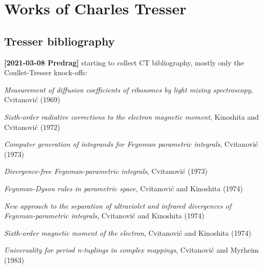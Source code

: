 
\chapter{Works of Charles Tresser}
\label{c-Tresser}

\section{Tresser bibliography}
\label{sect:Tresser}

{\bf [2021-03-08 Predrag]}
starting to collect CT bibliography, mostly only the Coullet-Tresser knock-offs:
\bigskip

{\em Measurement of diffusion coefficients of ribosomes by light mixing
spectroscopy},
{Cvitanovi{\'c}}
{(1969)}

{\em Sixth-order radiative corrections to the electron magnetic moment},
{Kinoshita and Cvitanovi{\'c}}
{(1972)}

{\em Computer generation of integrands for {Feynman} parametric integrals},
{Cvitanovi{\'c}}
{(1973)}

{\em Divergence-free {Feynman}-parametric integrals},
{Cvitanovi{\'c}}
{(1973)}

{\em {Feynman-Dyson} rules in parametric space},
{Cvitanovi{\'c} and Kinoshita}
{(1974)}

{\em New approach to the separation of ultraviolet and infrared
divergences of {Feynman}-parametric integrals},
{Cvitanovi{\'c} and Kinoshita}
{(1974)}

 {\em Sixth-order magnetic moment of the electron},
{Cvitanovi{\'c} and Kinoshita}
{(1974)}

{\em Universality for period n-tuplings in complex mappings},
{Cvitanovi{\'c} and Myrheim}
{(1983)}

